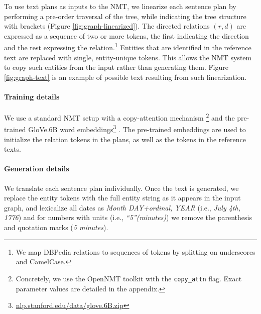 \documentclass[11pt,a4paper]{article}
\begin{document}
To use text plans as inputs to the NMT, we linearize each sentence plan by performing a pre-order traversal of the tree, while indicating the tree structure with brackets (Figure \ref{fig:graph-linearized}). The directed relations $(r,d)$ are expressed as a sequence of two or more tokens, the first indicating the direction and the rest expressing the relation.\footnote{We map DBPedia relations to sequences of tokens by splitting on underscores and CamelCase.}  
Entities that are identified in the reference text are replaced with single, entity-unique tokens. This allows the NMT system to copy such entities from the input rather than generating them.
Figure \ref{fig:graph-text} is an example of possible text resulting from such linearization.

\paragraph{Training details} 
We use a standard NMT setup with a copy-attention mechanism \cite{gulcehre2016pointing}\footnote{Concretely, we use the OpenNMT toolkit \cite{klein2017opennmt} with the \texttt{copy\_attn} flag. Exact parameter values are detailed in the appendix.}
and the pre-trained GloVe.6B word embeddings\footnote{\url{nlp.stanford.edu/data/glove.6B.zip}} \cite{pennington2014glove}.  The pre-trained embeddings are used to initialize the relation tokens in the plans, as well as the tokens in the reference texts. 

\paragraph{Generation details} 
We translate each sentence plan individually. Once the text is generated, we replace the entity tokens with the full entity string as it appears in the input graph, and lexicalize all dates as \emph{Month DAY+ordinal, YEAR} (i.e., \emph{July 4th, 1776}) and for numbers with units (i.e., \emph{``5''(minutes)}) we remove the parenthesis and quotation marks (\emph{5 minutes}). 
\end{document}
